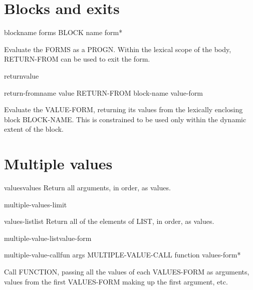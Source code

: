 \documentclass[10pt,english]{book}
\begin{document}
\section{Blocks and exits}
\label{sec:blocks-exits}

\begin{specialop}{block}{name \rest forms}
  BLOCK name form*

Evaluate the FORMS as a PROGN. Within the lexical scope of the body,
RETURN-FROM can be used to exit the form.
\end{specialop}

\begin{macro}{return}{\op value}
  
\end{macro}

\begin{specialop}{return-from}{name \op value}
  RETURN-FROM block-name value-form

Evaluate the VALUE-FORM, returning its values from the lexically enclosing
block BLOCK-NAME. This is constrained to be used only within the dynamic
extent of the block.
\end{specialop}

\section{Multiple values}
\label{sec:multiple-values}

\begin{accessor}{values}{\rest values}
  Return all arguments, in order, as values.
\end{accessor}

\begin{constant}{multiple-values-limit}{}
  
\end{constant}

\begin{function}{values-list}{list}
  Return all of the elements of LIST, in order, as values.
\end{function}

\begin{macro}{multiple-value-list}{value-form}
  
\end{macro}

\begin{specialop}{multiple-value-call}{fun \rest args}
  MULTIPLE-VALUE-CALL function values-form*

Call FUNCTION, passing all the values of each VALUES-FORM as arguments,
values from the first VALUES-FORM making up the first argument, etc.
\end{specialop}
\end{document}
